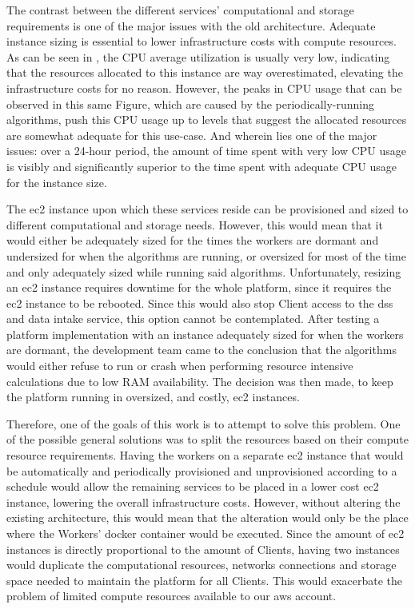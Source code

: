 The contrast between the different services' computational and storage requirements is one of the major issues with the old architecture. Adequate instance sizing is essential to lower infrastructure costs with compute resources. As can be seen in , the CPU average utilization is usually very low, indicating that the resources allocated to this instance are way overestimated, elevating the infrastructure costs for no reason. However, the peaks in CPU usage that can be observed in this same Figure, which are caused by the periodically-running algorithms, push this CPU usage up to levels that suggest the allocated resources are somewhat adequate for this use-case. And wherein lies one of the major issues: over a 24-hour period, the amount of time spent with very low CPU usage is visibly and significantly superior to the time spent with adequate CPU usage for the instance size. 

The \gls{ec2} instance upon which these services reside can be provisioned and sized to different computational and storage needs. However, this would mean that it would either be adequately sized for the times the workers are dormant and undersized for when the algorithms are running, or oversized for most of the time and only adequately sized while running said algorithms. Unfortunately, resizing an \gls{ec2} instance requires downtime for the whole platform, since it requires the \gls{ec2} instance to be rebooted. Since this would also stop Client access to the \gls{dss} and data intake service, this option cannot be contemplated. After testing a platform implementation with an instance adequately sized for when the workers are dormant, the development team came to the conclusion that the algorithms would either refuse to run or crash when performing resource intensive calculations due to low RAM availability. The decision was then made, to keep the platform running in oversized, and costly, \gls{ec2} instances.

Therefore, one of the goals of this work is to attempt to solve this problem. One of the possible general solutions was to split the resources based on their compute resource requirements. Having the workers on a separate \gls{ec2} instance that would be automatically and periodically provisioned and unprovisioned according to a schedule would allow the remaining services to be placed in a lower cost \gls{ec2} instance, lowering the overall infrastructure costs. However, without altering the existing architecture, this would mean that the alteration would only be the place where the Workers' docker container would be executed. Since the amount of \gls{ec2} instances is directly proportional to the amount of Clients, having two instances would duplicate the computational resources, networks connections and storage space needed to maintain the platform for all Clients. This would exacerbate the problem of limited compute resources available to our \gls{aws} account.

